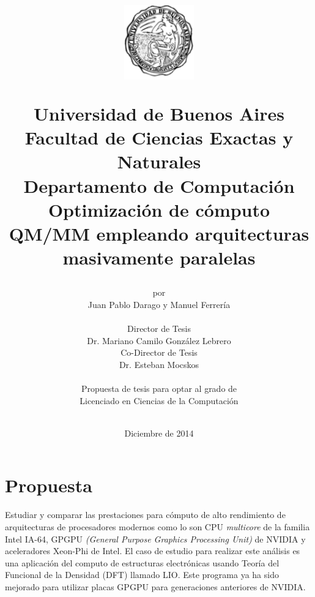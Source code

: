 \documentclass[a4paper, 12pt]{article}
\begin{document}

\title {
\begin{figure}[h]
\begin{center}
\includegraphics[keepaspectratio, width=3cm]{escudo}
\end{center}
\end{figure}
Universidad de Buenos Aires\\
Facultad de Ciencias Exactas y Naturales\\
Departamento de Computaci\'on\\
\vspace{10mm}
\Huge\textbf{Optimizaci\'on de c\'omputo QM/MM empleando arquitecturas masivamente paralelas}
\vspace{10mm}
}

\author{por \\
    Juan Pablo Darago y Manuel Ferrer\'ia\\\
        \\
        Director de Tesis\\
        Dr. Mariano Camilo Gonz\'alez Lebrero\\
        Co-Director de Tesis\\
        Dr. Esteban Mocskos\\
        \\
        Propuesta de tesis para optar al grado de \\
        Licenciado en Ciencias de la Computaci\'on\\
        \\
        }
\date{Diciembre de 2014}

\maketitle

\pagebreak

\section*{Propuesta}

Estudiar y comparar las prestaciones para c\'omputo de alto rendimiento de arquitecturas de procesadores modernos como lo son CPU \textit{multicore}
de la familia Intel IA-64, GPGPU \textit{(General Purpose Graphics Processing Unit)} de NVIDIA y aceleradores Xeon-Phi de Intel. El caso de
estudio para realizar este an\'alisis es una aplicaci\'on del computo de estructuras electr\'onicas usando Teor\'ia del Funcional de la Densidad (DFT) llamado LIO.
Este programa ya ha sido mejorado para utilizar placas GPGPU para generaciones anteriores de NVIDIA.
\end{document}
